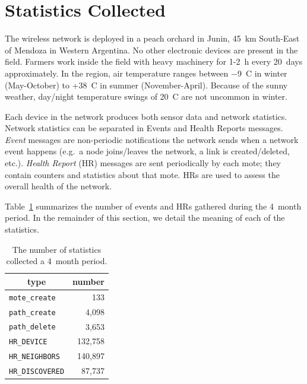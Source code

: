 \documentclass{sig-alternate}
\newcommand{\HRNEIGHBORS}         {{\tt HR\_NEIGHBORS}\xspace}
\newcommand{\HRDISCOVERED}        {{\tt HR\_DISCOVERED}\xspace}
\newcommand{\HRDEVICE}            {{\tt HR\_DEVICE}\xspace}
\newcommand{\pathcreate}          {{\tt path\_create}\xspace}
\newcommand{\pathdelete}          {{\tt path\_delete}\xspace}
\newcommand{\motecreate}          {{\tt mote\_create}\xspace}
\newcommand{\NUMHRNEIGHBORS}      {140,897}
\begin{document}
\section{Statistics Collected}
\label{sec:collected}


The wireless network is deployed in a peach orchard in Junin, 45~km South-East of Mendoza in Western Argentina.
No other electronic devices are present in the field.
Farmers work inside the field with heavy machinery for 1-2~h every 20~days approximately.
In the region, air temperature ranges between $-$9~C in winter (May-October) to +38~C in summer (November-April).
Because of the sunny weather, day/night temperature swings of 20~C are not uncommon in winter.


Each device in the network produces both sensor data and network statistics.
Network statistics can be separated in Events and Health Reports messages.
\textit{Event} messages are non-periodic notifications the network sends when a network event happens (e.g.~a node joins/leaves the network, a link is created/deleted, etc.).
\textit{Health Report} (HR) messages are sent periodically by each mote; they contain counters and statistics about that mote.
HRs are used to assess the overall health of the network.


Table~\ref{tab:msg_stats} summarizes the number of events and HRs gathered during the 4~month period.
In the remainder of this section, we detail the meaning of each of the statistics.

\begin{table}
    \centering
    \begin{tabular}{|l|r|}
        \hline
        \multicolumn{1}{|c|}{type} & \multicolumn{1}{|c|}{number} \\ \hline
        \hline
        \motecreate     &     133         \\ \hline
        \pathcreate     &   4,098         \\ \hline
        \pathdelete     &   3,653         \\ \hline
        \HRDEVICE       & 132,758         \\ \hline
        \HRNEIGHBORS    & \NUMHRNEIGHBORS \\ \hline
        \HRDISCOVERED   &  87,737         \\ \hline
    \end{tabular}
    \caption{The number of statistics collected a 4~month period.}
    \label{tab:msg_stats}
\end{table}
\end{document}
